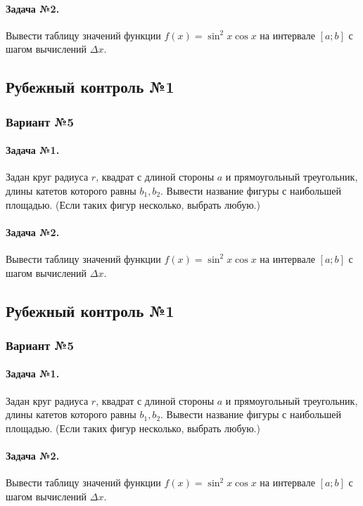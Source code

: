 \documentclass[12pt,a4paper]{report}
\begin{document}
\paragraph*{Задача №2.} Вывести таблицу значений функции $f(x) = \sin^2 x \cos x$ на интервале $[a; b]$ с шагом вычислений $\Delta x$.

\subsection*{Рубежный контроль №1}
\subsubsection*{Вариант №5}
\paragraph*{Задача №1.} Задан круг радиуса $r$, квадрат с длиной стороны $a$ и прямоугольный треугольник, длины катетов которого равны $b_1, b_2$. Вывести название фигуры с наибольшей площадью. (Если таких фигур несколько, выбрать любую.)
\paragraph*{Задача №2.} Вывести таблицу значений функции $f(x) = \sin^2 x \cos x$ на интервале $[a; b]$ с шагом вычислений $\Delta x$.

\subsection*{Рубежный контроль №1}
\subsubsection*{Вариант №5}
\paragraph*{Задача №1.} Задан круг радиуса $r$, квадрат с длиной стороны $a$ и прямоугольный треугольник, длины катетов которого равны $b_1, b_2$. Вывести название фигуры с наибольшей площадью. (Если таких фигур несколько, выбрать любую.)
\paragraph*{Задача №2.} Вывести таблицу значений функции $f(x) = \sin^2 x \cos x$ на интервале $[a; b]$ с шагом вычислений $\Delta x$.
\end{document}
